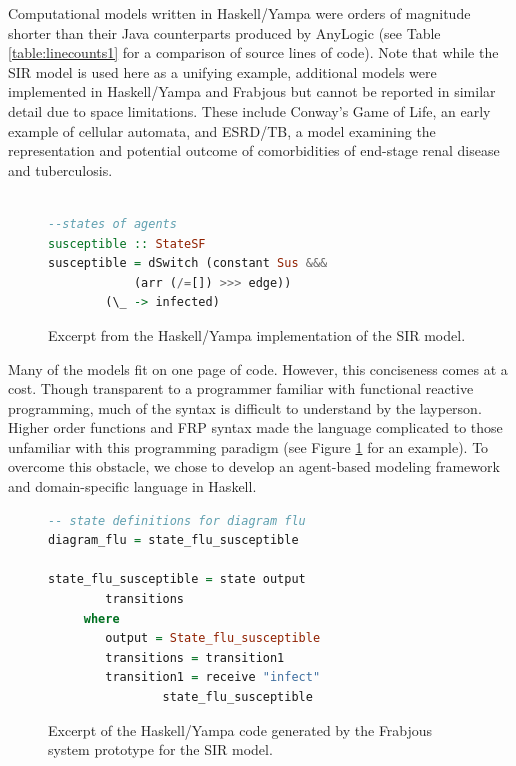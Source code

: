 \documentclass{sig-alternate}
\begin{document}
Computational models written in Haskell/Yampa were orders of magnitude shorter than their Java counterparts produced by AnyLogic  (see Table \ref{table:linecounts1} for a comparison of source lines of code). Note that while the SIR model is used here as a unifying example, additional models were implemented in Haskell/Yampa and Frabjous but cannot be reported in similar detail due to space limitations. These include Conway's Game of Life, an early example of cellular automata, and ESRD/TB, a model examining the representation and potential outcome of comorbidities of end-stage renal disease and tuberculosis.

\begin{figure}[htbp]
\begin{center}

\begin{lstlisting}[language=haskell]

--states of agents
susceptible :: StateSF
susceptible = dSwitch (constant Sus &&& 
			(arr (/=[]) >>> edge))
		(\_ -> infected)
\end{lstlisting}

\caption{Excerpt from the Haskell/Yampa implementation of the SIR model.}
\label{sir_yampa}
\end{center}
\end{figure}

Many of the models fit on one page of code. However, this conciseness comes at a cost. Though transparent to a programmer familiar with functional reactive programming, much of the syntax is difficult to understand by the layperson. Higher order functions and FRP syntax made the language complicated to those unfamiliar with this programming paradigm (see Figure \ref{sir_yampa} for an example). To overcome this obstacle, we chose to develop an agent-based modeling framework and domain-specific language in Haskell.


\begin{figure}
\begin{center}
\begin{lstlisting}[language=haskell]
-- state definitions for diagram flu
diagram_flu = state_flu_susceptible

state_flu_susceptible = state output
		transitions
     where
        output = State_flu_susceptible
        transitions = transition1
        transition1 = receive "infect" 
        		state_flu_susceptible

\end{lstlisting}
\caption{Excerpt of the Haskell/Yampa code generated by the Frabjous system prototype for the SIR model.}
\label{sir_generated_frp}
\end{center}
\end{figure}
\end{document}
